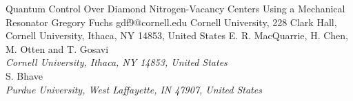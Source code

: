 \begin{conf-abstract}[]
{Quantum Control Over Diamond Nitrogen-Vacancy Centers Using a Mechanical Resonator}
{\color{blue} Gregory Fuchs}
{gdf9@cornell.edu}
{Cornell University, 228 Clark Hall, Cornell University, Ithaca, NY 14853, United States}
{{\color{blue}E. R. MacQuarrie, H. Chen, M. Otten and T. Gosavi}\\ \textit{Cornell University, Ithaca, NY 14853, United States}\\ 
{\color{blue}S. Bhave}\\ \textit{ Purdue University, West Laffayette, IN 47907, United States}\\ 
\decofourleft \decofourright}





\printbibliography[heading=none]

\end{conf-abstract}
